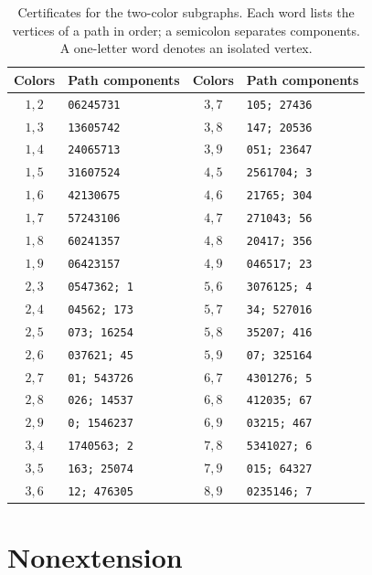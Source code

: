 \documentclass[11pt]{article}
\begin{document}
\begin{table}[htbp]
\centering
\small
\setlength{\tabcolsep}{8pt}
\begin{tabular}{clcl}
\toprule
Colors & Path components & Colors & Path components\\
\midrule
\(1,2\)&\texttt{06245731}&\(3,7\)&\texttt{105; 27436}\\
\(1,3\)&\texttt{13605742}&\(3,8\)&\texttt{147; 20536}\\
\(1,4\)&\texttt{24065713}&\(3,9\)&\texttt{051; 23647}\\
\(1,5\)&\texttt{31607524}&\(4,5\)&\texttt{2561704; 3}\\
\(1,6\)&\texttt{42130675}&\(4,6\)&\texttt{21765; 304}\\
\(1,7\)&\texttt{57243106}&\(4,7\)&\texttt{271043; 56}\\
\(1,8\)&\texttt{60241357}&\(4,8\)&\texttt{20417; 356}\\
\(1,9\)&\texttt{06423157}&\(4,9\)&\texttt{046517; 23}\\
\(2,3\)&\texttt{0547362; 1}&\(5,6\)&\texttt{3076125; 4}\\
\(2,4\)&\texttt{04562; 173}&\(5,7\)&\texttt{34; 527016}\\
\(2,5\)&\texttt{073; 16254}&\(5,8\)&\texttt{35207; 416}\\
\(2,6\)&\texttt{037621; 45}&\(5,9\)&\texttt{07; 325164}\\
\(2,7\)&\texttt{01; 543726}&\(6,7\)&\texttt{4301276; 5}\\
\(2,8\)&\texttt{026; 14537}&\(6,8\)&\texttt{412035; 67}\\
\(2,9\)&\texttt{0; 1546237}&\(6,9\)&\texttt{03215; 467}\\
\(3,4\)&\texttt{1740563; 2}&\(7,8\)&\texttt{5341027; 6}\\
\(3,5\)&\texttt{163; 25074}&\(7,9\)&\texttt{015; 64327}\\
\(3,6\)&\texttt{12; 476305}&\(8,9\)&\texttt{0235146; 7}\\
\bottomrule
\end{tabular}
\caption{Certificates for the two-color subgraphs.
Each word lists the vertices of a path in order; a semicolon
separates components. A one-letter word denotes an isolated vertex.}
\label{tab:paths}
\end{table}

\section{Nonextension}
\end{document}
